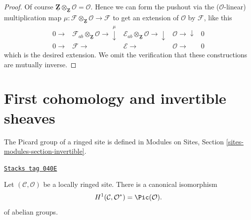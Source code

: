 \begin{proof}
Of course
$\underline{\mathbf{Z}} \otimes_{\underline{\mathbf{Z}}} \mathcal{O}
= \mathcal{O}$.
Hence we can form the pushout via the ($\mathcal{O}$-linear) multiplication map
$\mu : \mathcal{F} \otimes_{\underline{\mathbf{Z}}} \mathcal{O}
\to \mathcal{F}$ to get an extension of $\mathcal{O}$ by
$\mathcal{F}$, like this
$$
\begin{array}{ccccc}0 \longrightarrow & \mathcal{F}_{ab} \otimes_{\underline{\mathbf{Z}}} \mathcal{O}
\longrightarrow\overset{\mu}{\downarrow} & \mathcal{E}_{ab} \otimes_{\underline{\mathbf{Z}}} \mathcal{O}
\longrightarrow\downarrow & \mathcal{O} \longrightarrow\downarrow & 0 \\ 0 \longrightarrow & \mathcal{F} \longrightarrow & \mathcal{E} \longrightarrow & \mathcal{O} \longrightarrow & 0\end{array}
$$
which is the desired extension. We omit the verification that these
constructions are mutually inverse.
\end{proof}

\section{First cohomology and invertible sheaves}
\label{sites-cohomology-section-invertible-sheaves}
The Picard group of a ringed site is defined in
Modules on Sites, Section \ref{sites-modules-section-invertible}.

\begin{lemma}[H1 invertible]
\label{sites-cohomology-lemma-h1-invertible}
\href{https://stacks.math.columbia.edu/tag/040E}{\texttt{Stacks tag 040E}}

Let $(\mathcal{C}, \mathcal{O})$ be a locally ringed site.
There is a canonical isomorphism
$$
H^1(\mathcal{C}, \mathcal{O}^*) = \Pic(\mathcal{O}).
$$
of abelian groups.
\end{lemma}

